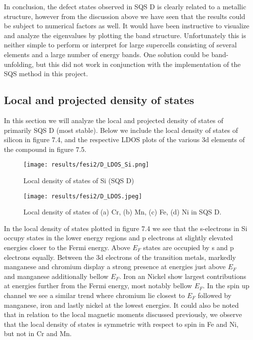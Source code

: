 In conclusion, the defect states observed in SQS D is clearly related to a metallic structure, however from the discussion above we have seen that the results could be subject to numerical factors as well. It would have been instructive to visualize and analyze the eigenvalues by plotting the band structure. Unfortunately this is neither simple to perform or interpret for large supercells consisting of several elements and a large number of energy bands. One solution could be band-unfolding, but this did not work in conjunction with the implementation of the SQS method in this project. 


\newpage
\subsection{Local and projected density of states}
In this section we will analyze the local and projected density of states of primarily SQS D (most stable). Below we include the local density of states of silicon in figure 7.4, and the respective LDOS plots of the various 3d elements of the compound in figure 7.5.  
  
\begin{figure}[H]
	\centering
	\texttt{[image: results/fesi2/D\_LDOS\_Si.png]}
	\caption{Local density of states of Si (SQS D)}
\end{figure} 

\begin{figure}[H]
	\centering
	\texttt{[image: results/fesi2/D\_LDOS.jpeg]}
	\caption{Local density of states of (a) Cr, (b) Mn, (c) Fe, (d) Ni in SQS D.}
\end{figure}   
  
In the local density of states plotted in figure 7.4 we see that the s-electrons in Si occupy states in the lower energy regions and p electrons at slightly elevated energies closer to the Fermi energy. Above $E_F$ states are occupied by s and p electrons equally. Between the 3d electrons of the transition metals, markedly manganese and chromium display a strong presence at energies just above $E_F$ and manganese additionally bellow $E_F$. Iron an Nickel show largest contributions at energies further from the Fermi energy, most notably bellow $E_F$. In the spin up channel we see a similar trend where chromium lie closest to $E_F$ followed by manganese, iron and lastly nickel at the lowest energies. It could also be noted that in relation to the local magnetic moments discussed previously, we observe that the local density of states is symmetric with respect to spin in Fe and Ni, but not in Cr and Mn. 

